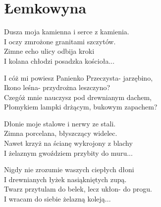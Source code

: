 \section{Łemkowyna}
\begin{text}
Dusza moja kamienna i serce z kamienia.\\
I oczy zmrożone granitami szczytów.\\
Zimne echo ulicy odbija kroki\\
I kolana chłodzi posadzka kościoła...

\vin I cóż mi powiesz Panienko Przeczysta- jarzębino,\\
\vin Ikono leśna- przydrożna leszczyno?\\
\vin Czegóż mnie nauczysz pod drewnianym dachem,\\
\vin Płomykiem lampki drżącym, bukowym zapachem?

Dłonie moje stalowe i nerwy ze stali.\\
Zimna porcelana, błyszczący widelec.\\
Nawet krzyż na ścianę wykrojony z blachy\\
I żelaznym gwoździem przybity do muru...

Nigdy nie zrozumie waszych ciepłych dłoni\\
I drewnianych łyżek nasiąkniętych zupą.\\
Twarz przytulam do belek, lecz ukłon- do progu.\\
I wracam do siebie żelazną koleją...
\end{text}